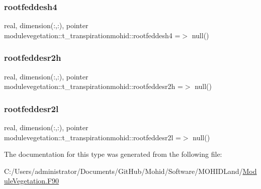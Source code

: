 \subsubsection{\texorpdfstring{rootfeddesh4}{rootfeddesh4}}
{\footnotesize\ttfamily real, dimension(\+:,\+:), pointer modulevegetation\+::t\+\_\+transpirationmohid\+::rootfeddesh4 =$>$ null()\hspace{0.3cm}{\ttfamily [private]}}

\mbox{\label{structmodulevegetation_1_1t__transpirationmohid_a2e78f687bbe4c55b0adac3160ab1731b}} 
\subsubsection{\texorpdfstring{rootfeddesr2h}{rootfeddesr2h}}
{\footnotesize\ttfamily real, dimension(\+:,\+:), pointer modulevegetation\+::t\+\_\+transpirationmohid\+::rootfeddesr2h =$>$ null()\hspace{0.3cm}{\ttfamily [private]}}

\mbox{\label{structmodulevegetation_1_1t__transpirationmohid_a2da1f6199c7e8526ef095b7fbb3ce3bd}} 
\subsubsection{\texorpdfstring{rootfeddesr2l}{rootfeddesr2l}}
{\footnotesize\ttfamily real, dimension(\+:,\+:), pointer modulevegetation\+::t\+\_\+transpirationmohid\+::rootfeddesr2l =$>$ null()\hspace{0.3cm}{\ttfamily [private]}}



The documentation for this type was generated from the following file\+:\begin{DoxyCompactItemize}
\item 
C\+:/\+Users/administrator/\+Documents/\+Git\+Hub/\+Mohid/\+Software/\+M\+O\+H\+I\+D\+Land/\mbox{\hyperlink{_module_vegetation_8_f90}{Module\+Vegetation.\+F90}}\end{DoxyCompactItemize}
